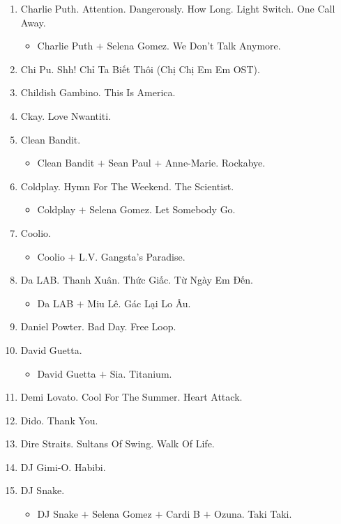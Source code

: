 \documentclass{article}
\begin{document}
\begin{enumerate}
	\item {\sc Charlie Puth.} Attention. Dangerously. How Long. Light Switch. One Call Away.
	\begin{itemize}
		\item {\sc Charlie Puth $+$ Selena Gomez.} We Don't Talk Anymore.
	\end{itemize}
	\item {\sc Chi Pu.} Shh! Chỉ Ta Biết Thôi (Chị Chị Em Em OST).
	\item {\sc Childish Gambino.} This Is America.
	\item {\sc Ckay.} Love Nwantiti.
	\item {\sc Clean Bandit.}
	\begin{itemize}
		\item {\sc Clean Bandit $+$ Sean Paul $+$ Anne-Marie.} Rockabye.
	\end{itemize}
	\item {\sc Coldplay.} Hymn For The Weekend. The Scientist.
	\begin{itemize}
		\item {\sc Coldplay $+$ Selena Gomez.} Let Somebody Go.
	\end{itemize}
	\item {\sc Coolio.}
	\begin{itemize}
		\item {\sc Coolio $+$ L.V.} Gangsta's Paradise.
	\end{itemize}
	\item {\sc Da LAB.} Thanh Xuân. Thức Giấc. Từ Ngày Em Đến.
	\begin{itemize}
		\item {\sc Da LAB $+$ Miu Lê.} Gác Lại Lo Âu.
	\end{itemize}
	\item {\sc Daniel Powter.} Bad Day. Free Loop.
	\item {\sc David Guetta.}
	\begin{itemize}
		\item {\sc David Guetta $+$ Sia.} Titanium.
	\end{itemize}
	\item {\sc Demi Lovato.} Cool For The Summer. Heart Attack.
	\item {\sc Dido.} Thank You.
	\item {\sc Dire Straits.} Sultans Of Swing. Walk Of Life.
	\item {\sc DJ Gimi-O.} Habibi.
	\item {\sc DJ Snake.}
	\begin{itemize}
		\item {\sc DJ Snake $+$ Selena Gomez $+$ Cardi B $+$ Ozuna.} Taki Taki.

\end{itemize}
\end{enumerate}
\end{document}

